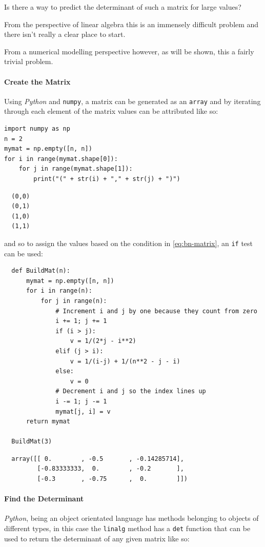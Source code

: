 \documentclass[11pt]{article}
\begin{document}
Is there a way to predict the determinant of such a matrix for large values?

From the perspective of linear algebra this is an immensely difficult problem
and there isn't really a clear place to start.

From a numerical modelling perspective however, as will be shown, this a fairly trivial problem.

\paragraph{Create the Matrix}
\label{create-the-matrix}
Using \emph{Python} and \texttt{numpy}, a matrix can be generated as an \texttt{array} and by
iterating through each element of the matrix values can be attributed like so:

\begin{verbatim}
import numpy as np
n = 2
mymat = np.empty([n, n])
for i in range(mymat.shape[0]):
    for j in range(mymat.shape[1]):
        print("(" + str(i) + "," + str(j) + ")")
\end{verbatim}

\begin{verbatim}
  (0,0)
  (0,1)
  (1,0)
  (1,1)
\end{verbatim}

and so to assign the values based on the condition in \eqref{eq:bn-matrix}, an
\texttt{if} test can be used:

\begin{verbatim}
  def BuildMat(n):
      mymat = np.empty([n, n])
      for i in range(n):
          for j in range(n):
              # Increment i and j by one because they count from zero
              i += 1; j += 1
              if (i > j):
                  v = 1/(2*j - i**2)
              elif (j > i):
                  v = 1/(i-j) + 1/(n**2 - j - i)
              else:
                  v = 0
              # Decrement i and j so the index lines up
              i -= 1; j -= 1
              mymat[j, i] = v
      return mymat

  BuildMat(3)
\end{verbatim}

\begin{verbatim}
  array([[ 0.        , -0.5       , -0.14285714],
         [-0.83333333,  0.        , -0.2       ],
         [-0.3       , -0.75      ,  0.        ]])
\end{verbatim}

\paragraph{Find the Determinant}
\label{find-the-determinant}
\emph{Python}, being an object orientated language has methods belonging to objects of different types, in this case the \texttt{linalg} method has a \texttt{det} function that can be used to return the determinant of any given matrix like so:
\end{document}
